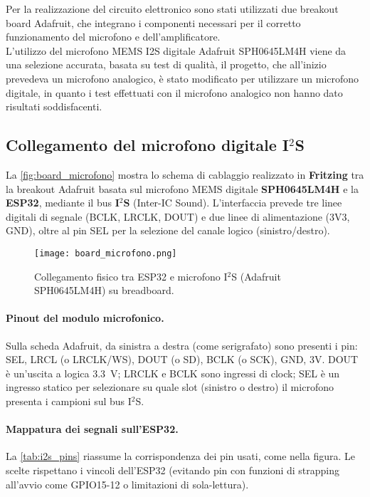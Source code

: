 Per la realizzazione del circuito elettronico sono stati utilizzati due breakout board Adafruit, che integrano i componenti necessari per il corretto funzionamento
  del microfono e dell'amplificatore.\\
  L'utilizzo del microfono MEMS I2S digitale Adafruit SPH0645LM4H viene da una selezione accurata, basata su test di qualità,
  il progetto, che all'inizio prevedeva un microfono analogico, è stato modificato per utilizzare un microfono digitale,
  in quanto i test effettuati con il microfono analogico non hanno dato risultati soddisfacenti.\\



  \subsection{Collegamento del microfono digitale I$^2$S}
  \label{subsec:conn_mic}
  
  La \autoref{fig:board_microfono} mostra lo schema di cablaggio realizzato in \textbf{Fritzing} tra la breakout Adafruit basata sul microfono MEMS digitale \textbf{SPH0645LM4H} e la \textbf{ESP32}, mediante il bus \textbf{I$^2$S} (Inter-IC Sound). L’interfaccia prevede tre linee digitali di segnale
  (BCLK, LRCLK, DOUT) e due linee di alimentazione (3V3, GND), oltre al pin SEL per la selezione del canale logico (sinistro/destro).
  
  \begin{figure}[H]
    \centering
    \texttt{[image: board\_microfono.png]}
    \caption{Collegamento fisico tra ESP32 e microfono I$^2$S (Adafruit SPH0645LM4H) su breadboard.}
    \label{fig:board_microfono}
  \end{figure} 

  \paragraph{Pinout del modulo microfonico.}
  Sulla scheda Adafruit, da sinistra a destra (come serigrafato) sono presenti i pin: SEL, LRCL (o LRCLK/WS), DOUT (o SD), BCLK (o SCK), GND, 3V.  
  DOUT è un’uscita a logica \SI{3.3}{\volt}; LRCLK e BCLK sono ingressi di clock; SEL è un ingresso statico per selezionare su quale slot (sinistro o destro) il microfono presenta i campioni sul bus I$^2$S.
  
  \paragraph{Mappatura dei segnali sull'ESP32.}
  La \autoref{tab:i2s_pins} riassume la corrispondenza dei pin usati, come nella figura. Le scelte rispettano i vincoli dell'ESP32 (evitando pin con funzioni di strapping all'avvio come GPIO15-12 o limitazioni di sola-lettura).
  
